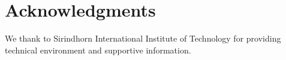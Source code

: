 \documentclass[10pt,letterpaper]{article}
\begin{document}
	\section*{Acknowledgments}
	We thank to Sirindhorn International Institute of Technology for providing technical environment and supportive information.
	
	
	
	\nolinenumbers
	
\end{document}
